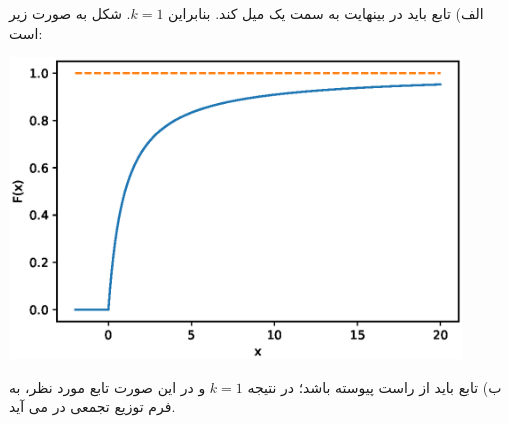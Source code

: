 \documentclass[10pt,letterpaper]{report}
\begin{document}
الف) تابع  باید در بینهایت به سمت یک میل کند. بنابراین $k=1$. شکل  به صورت زیر است:
\begin{center}
\includegraphics[width=120mm]{Q2A.eps}
\end{center}
ب) تابع  باید از راست پیوسته باشد؛ در نتیجه $k=1$ و در این صورت تابع مورد نظر، به فرم توزیع تجمعی در می آید.
\end{document}
